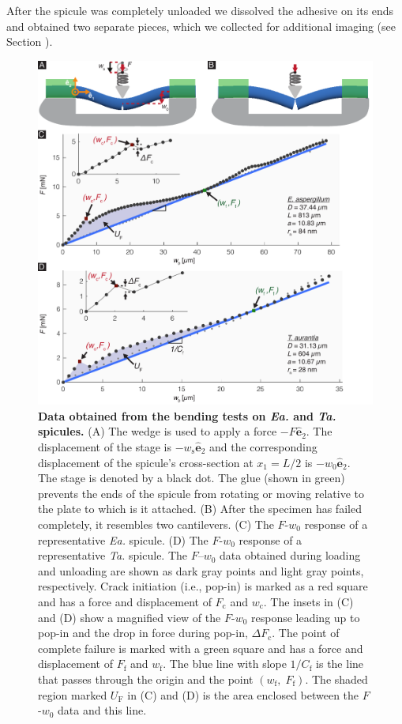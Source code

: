 \documentclass[12pt,onecolumn]{article}
\makeatletter
\DeclareRobustCommand*{\nameref}[1]{%
      \emph{\myorg@nameref{#1}}%
    }%
\newcommand{\ey}{\hat{\mathbf{e}}_2}
\newcommand{\TA}{\textit{Ta.\@}\xspace}
\newcommand{\EA}{\textit{Ea.\@}\xspace}
\makeatother
\begin{document}
After the spicule was completely unloaded we dissolved the adhesive on its ends and obtained two separate pieces, which we collected for additional imaging (see Section \nameref{sec:fracto}).
%
			\begin{figure}[ht!]
			\centering
			\includegraphics[width=\textwidth]{../Figures/FigureTest/Figure4_V7A.pdf}
			\caption{\textbf{Data obtained from the bending tests on \EA and \TA spicules.} (A) The wedge is used to apply a force $-F\ey$. The displacement of the stage is $-w_\mathrm{s}\ey$ and the corresponding displacement of the spicule's cross-section at $x_1=L/2$ is $-w_0\ey$. The stage is denoted by a black dot. The glue (shown in green) prevents the ends of the spicule from rotating or moving relative to the plate to which is it attached. (B) After the specimen has failed completely, it resembles two cantilevers. (C) The $F$-$w_0$ response of a representative \EA spicule. (D) The $F$-$w_0$ response of a representative \TA spicule. The $F$--$w_0$ data obtained during loading and unloading are shown as dark gray points and light gray points, respectively. Crack initiation (i.e., pop-in) is marked as a red square and has a force and displacement of $F_\mathrm{c}$ and $w_\mathrm{c}$. The insets in (C) and (D) show a magnified view of the $F$-$w_0$ response leading up to pop-in and the drop in force during pop-in, $\Delta F_\mathrm{c}$. The point of complete failure is marked with a green square and has a force and displacement of $F_\mathrm{f}$ and $w_\mathrm{f}$. The blue line with slope $1/C_\mathrm{f}$ is the line that passes through the origin and the point $(w_\mathrm{f},\; F_\mathrm{f})$. The shaded region marked $U_\mathrm{F}$ in (C) and (D) is the area enclosed between the $F$-$w_0$ data and this line.
			}
			\label{fig:test}
			\end{figure}
 			
\end{document}

